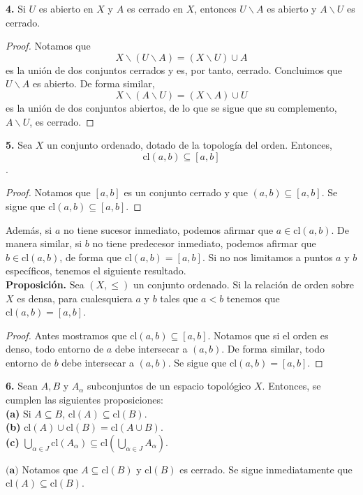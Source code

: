 \documentclass{article}
\begin{document}
\begin{mybox}
\textbf{4. } 	Si $U$ es abierto en $X$ y $A$ es cerrado en $X$, entonces $U \backslash A$ es abierto y $A \backslash U$ es cerrado.
\end{mybox}
\begin{proof}
	Notamos que 
	$$ X \backslash ( U \backslash  A) = (X \backslash U) \cup A $$
	es la unión de dos conjuntos cerrados y es, por tanto, cerrado. Concluimos que $U\backslash A$ es abierto.  De forma similar,
	$$X \backslash ( A \backslash  U) = (X \backslash A) \cup U $$
	es la unión de dos conjuntos abiertos, de lo que se sigue que su complemento, $A \backslash U$, es cerrado. 
\end{proof}	

\begin{mybox}
	\textbf{5. } Sea $X$ un conjunto ordenado, dotado de la topología del orden. Entonces, 
	$$ \text{cl}(a, b) \subseteq [a, b ] $$. 
\end{mybox}	
\begin{proof}
	Notamos que $[a, b]$ es un conjunto cerrado y que $(a, b) \subseteq [a, b]$. Se sigue que $\text{cl}(a, b) \subseteq [a, b]$.
\end{proof}

Además, si $a$ no tiene sucesor inmediato, podemos afirmar que $a \in \text{cl}(a, b)$. De manera similar, si $b$ no tiene predecesor inmediato, podemos afirmar que $b \in \text{cl}(a, b)$, de forma que $\text{cl}(a, b) = [a, b]$. Si no nos limitamos a puntos $a$ y $b$ específicos, tenemos el siguiente resultado. \\

\textbf{Proposición. } Sea $(X, \leq )$ un conjunto ordenado. Si la relación de orden sobre $X$ es densa, para cualesquiera $a$ y $b$ tales que $a < b$ tenemos que $\text{cl}(a, b) = [a, b]$.
\begin{proof}
	Antes mostramos que $\text{cl}(a, b) \subseteq [a, b]$. Notamos que si el orden es denso, todo entorno de $a$ debe intersecar a $(a, b)$. De forma similar, todo entorno de $b$ debe intersecar a $(a, b)$. Se sigue que $\text{cl}(a, b) = [a, b]$.
\end{proof}
\begin{mybox}
	\textbf{6.} Sean $A, B$ y $A_{\alpha}$ subconjuntos de un espacio topológico $X$. Entonces, se cumplen las siguientes proposiciones: \\
	
	\textbf{(a)} Si $A\subseteq B$, $\text{cl}(A) \subseteq \text{cl}(B)$.  \\
	
    \textbf{(b)} $\text{cl}(A) \cup \text{cl}(B) = \text{cl}(A \cup B) .$ \\
    
    \textbf{(c)} $\bigcup_{\alpha \in J} \text{cl}(A_{\alpha}) \subseteq  \text{cl}\left( \bigcup_{\alpha \in J} A_{\alpha} \right)$.  
	
\end{mybox}	
$\textbf{(a)}$ Notamos que $A \subseteq \text{cl}(B)$ y $\text{cl}(B)$ es cerrado. Se sigue inmediatamente que $\text{cl}(A) \subseteq \text{cl}(B)$. \\
\end{document}
